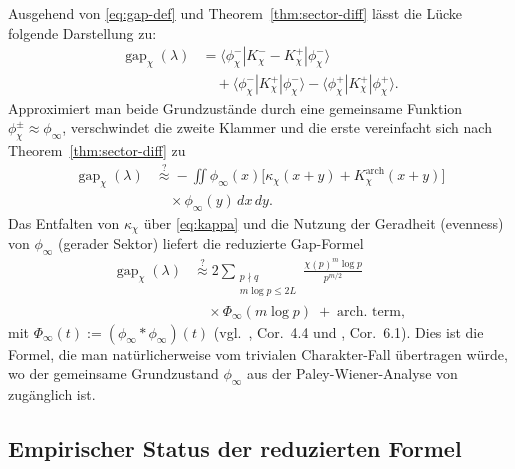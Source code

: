 \documentclass[a4paper,10pt,twocolumn]{article}
\theoremstyle{definition}
\theoremstyle{remark}
\newcommand{\gap}{\operatorname{gap}}
\newcommand{\chifn}{\chi}
\begin{document}
Ausgehend von \eqref{eq:gap-def} und
Theorem~\ref{thm:sector-diff} lässt die Lücke folgende Darstellung zu:
\begin{equation}
\label{eq:gap-matrix}
\begin{aligned}
  \gap_{\chifn}(\lambda)
    &= \langle\phi_{\chifn}^-|K_{\chifn}^--K_{\chifn}^+|\phi_{\chifn}^-\rangle\\
    &\quad + \langle\phi_{\chifn}^-|K_{\chifn}^+|\phi_{\chifn}^-\rangle
      - \langle\phi_{\chifn}^+|K_{\chifn}^+|\phi_{\chifn}^+\rangle.
\end{aligned}
\end{equation}
Approximiert man beide Grundzustände durch eine gemeinsame Funktion
$\phi_{\chifn}^\pm\approx\phi_\infty$, verschwindet die zweite Klammer und
die erste vereinfacht sich nach Theorem~\ref{thm:sector-diff} zu
\begin{equation}
\label{eq:gap-reduced}
\begin{aligned}
  \gap_{\chifn}(\lambda)
    &\overset{?}{\approx}
      -\iint \phi_\infty(x)\bigl[\kappa_{\chifn}(x+y)
      +K^{\mathrm{arch}}_{\chifn}(x+y)\bigr]\\
    &\quad\times\phi_\infty(y)\,dx\,dy.
\end{aligned}
\end{equation}
Das Entfalten von $\kappa_{\chifn}$ über \eqref{eq:kappa} und die Nutzung der Geradheit
(evenness) von $\phi_\infty$ (gerader Sektor) liefert die reduzierte Gap-Formel
\begin{equation}
\label{eq:gap-reduced-explicit}
\begin{aligned}
  \gap_{\chifn}(\lambda)
    &\overset{?}{\approx}
      2\sum_{\substack{p\nmid q\\m\log p\leq 2L}}
        \frac{\chifn(p)^m\log p}{p^{m/2}}\\
    &\quad\times\Phi_\infty(m\log p)
      \;+\;\text{arch.\ term},
\end{aligned}
\end{equation}
mit $\Phi_\infty(t):=(\phi_\infty\ast\phi_\infty)(t)$
(vgl.\ \cite{AnalyticKernel}, Cor.~4.4 und \cite{AnalyticGroundstate},
Cor.~6.1). Dies ist die Formel, die man natürlicherweise vom
trivialen Charakter-Fall übertragen würde, wo der gemeinsame Grundzustand $\phi_\infty$
aus der Paley-Wiener-Analyse von \cite{RH_II} zugänglich ist.

\subsection{Empirischer Status der reduzierten Formel}
\label{sec:formula-reduced-empirical}
\end{document}
